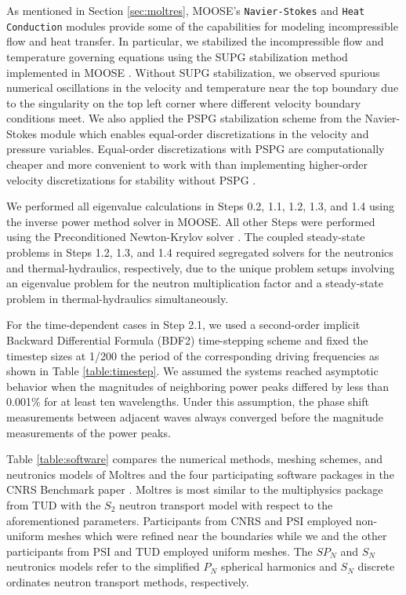 As mentioned in Section \ref{sec:moltres}, \gls{MOOSE}'s \texttt{Navier-Stokes}
and \texttt{Heat Conduction} modules provide some of the capabilities for
modeling incompressible flow and heat transfer. In particular, we stabilized
the incompressible flow and temperature governing equations using the
\gls{SUPG} stabilization method implemented in \gls{MOOSE}
\cite{peterson_overview_2018}. Without \gls{SUPG} stabilization, we
observed spurious numerical oscillations in the velocity and temperature near
the top boundary due to the singularity on the top left corner where different
velocity boundary conditions meet. We also applied the \gls{PSPG} stabilization
scheme \cite{hughes_new_1986} from the Navier-Stokes module
\cite{peterson_overview_2018}
which enables equal-order discretizations in the velocity and pressure
variables. Equal-order discretizations with \gls{PSPG} are computationally
cheaper and more convenient to work with than implementing higher-order
velocity discretizations for stability without \gls{PSPG}
\cite{chapelle_inf-sup_1993}.

We performed all eigenvalue calculations in Steps 0.2, 1.1, 1.2, 1.3, and 1.4
using the inverse power method solver in \gls{MOOSE}. All other Steps
were performed using the Preconditioned Newton-Krylov solver
\cite{gaston_physics-based_2015}. The coupled steady-state problems in
Steps 1.2, 1.3, and 1.4 required segregated solvers for the neutronics
and thermal-hydraulics, respectively, due to the unique problem
setups involving an eigenvalue problem for the neutron multiplication factor
and a steady-state problem in thermal-hydraulics simultaneously.

For the time-dependent cases in Step 2.1, we used a second-order
implicit Backward Differential Formula (BDF2) time-stepping scheme and fixed
the timestep sizes at 1/200 the period of the corresponding driving
frequencies as shown in Table \ref{table:timestep}.  We assumed the systems
reached asymptotic behavior when the magnitudes of neighboring power peaks
differed by less than 0.001\% for at least ten wavelengths. Under this
assumption, the phase shift measurements between adjacent waves always
converged before the magnitude measurements of the power peaks.

Table \ref{table:software} compares the numerical methods, meshing schemes, and
neutronics models of Moltres and the four participating software packages in
the CNRS Benchmark paper \citep{tiberga_results_2020}. Moltres is most similar
to the multiphysics package from TUD with the $S_2$ neutron transport model
with respect to the aforementioned parameters. Participants from CNRS and PSI
employed non-uniform meshes which were refined near the boundaries while we and
the other participants from PSI and TUD employed uniform meshes. The $SP_N$ and
$S_N$ neutronics models refer to the simplified $P_N$ spherical harmonics and
$S_N$ discrete ordinates neutron transport methods, respectively.


